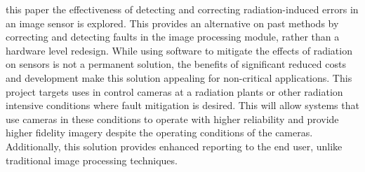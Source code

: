  this paper the effectiveness of detecting and correcting radiation-induced errors in an image sensor is explored. This provides an alternative on past methods by correcting and detecting faults in the image processing module, rather than a hardware level redesign. While using software to mitigate the effects of radiation on sensors is not a permanent solution, the benefits of significant reduced costs and development make this solution  appealing for non-critical applications. This project targets uses in control cameras at a radiation plants or other radiation intensive conditions where fault mitigation is desired. This will allow systems that use cameras in these conditions to operate with higher reliability and provide higher fidelity imagery despite the operating conditions of the cameras. Additionally, this solution provides enhanced reporting to the end user, unlike traditional image processing techniques.